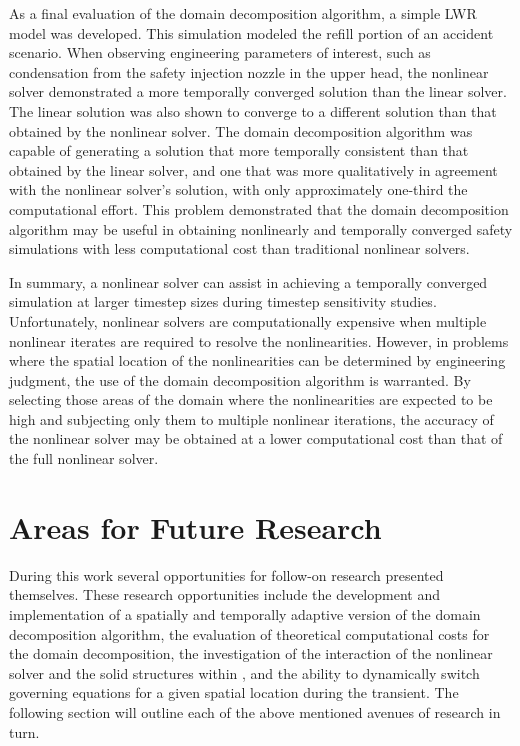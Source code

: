 As a final evaluation of the domain decomposition algorithm, a simple LWR model was developed.
This simulation modeled the refill portion of an accident scenario.
When observing engineering parameters of interest, such as condensation from the safety injection nozzle in the upper head, the nonlinear solver demonstrated a more temporally converged solution than the linear solver.
The linear solution was also shown to converge to a different solution than that obtained by the nonlinear solver.
The domain decomposition algorithm was capable of generating a solution that more temporally consistent than that obtained by the linear solver, and one that was more qualitatively in agreement with the nonlinear solver's solution, with only approximately one-third the computational effort.
This problem demonstrated that the domain decomposition algorithm may be useful in obtaining nonlinearly and temporally converged safety simulations with less computational cost than traditional nonlinear solvers.

In summary, a nonlinear solver can assist in achieving a temporally converged simulation at larger timestep sizes during timestep sensitivity studies.
Unfortunately, nonlinear solvers are computationally expensive when multiple nonlinear iterates are required to resolve the nonlinearities.
However, in problems where the spatial location of the nonlinearities can be determined by engineering judgment, the use of the domain decomposition algorithm is warranted.
By selecting those areas of the domain where the nonlinearities are expected to be high and subjecting only them to multiple nonlinear iterations, the accuracy of the nonlinear solver may be obtained at a lower computational cost than that of the full nonlinear solver.

\section{Areas for Future Research}
\label{sect:futureWork}
During this work several opportunities for follow-on research presented themselves.
These research opportunities include the development and implementation of a spatially and temporally adaptive version of the domain decomposition algorithm, the evaluation of theoretical computational costs for the domain decomposition, the investigation of the interaction of the nonlinear solver and the solid structures within \cobra{}, and the ability to dynamically switch governing equations for a given spatial location during the transient.
The following section will outline each of the above mentioned avenues of research in turn.

